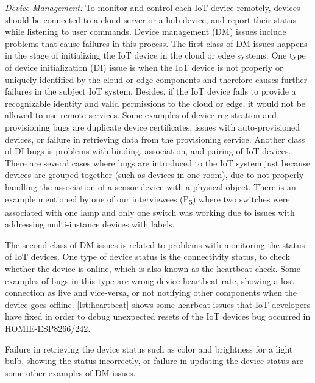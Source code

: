 \textit{Device Management:}
To monitor and control each IoT device remotely, devices should be connected to a cloud server or a hub device, and report their status while listening to user commands. Device management (DM) issues include problems that cause failures in this process. 
The first class of DM issues happens in the stage of initializing the IoT device in the cloud or edge systems. One type of device initialization (DI) issue is when the IoT device is not properly or uniquely identified by the cloud or edge components and therefore causes further failures in the subject IoT system. Besides, if the IoT device fails to provide a recognizable identity and valid permissions to the cloud or edge, it would not be allowed to use remote services. Some examples of device registration and provisioning bugs are duplicate device certificates, issues with auto-provisioned devices, or failure in retrieving data from the provisioning service. Another class of DI bugs is problems with binding, association, and pairing of IoT devices. There are several cases where bugs are introduced to the IoT system just because devices are grouped together (such as devices in one room), due to not properly handling the association of a sensor device with a physical object. There is an example mentioned by one of our interviewees (P\textsubscript{5}) where two switches were associated with one lamp and only one switch was working due to issues with addressing multi-instance devices with labels.

The second class of DM issues is related to problems with monitoring the status of IoT devices. One type of device status is the connectivity status, to check whether the device is online, which is also known as the heartbeat check. Some examples of bugs in this type are wrong device heartbeat rate, showing a lost connection as live and vice-versa, or not notifying other components when the device goes offline. \autoref{lst:heartbeat} shows some hearbeat issues that IoT developers have fixed in order to debug unexpected resets of the IoT devices bug occurred in HOMIE-ESP8266/242.

Failure in retrieving the device status such as color and brightness for a light bulb, showing the status incorrectly, or failure in updating the device status are some other examples of DM issues.

